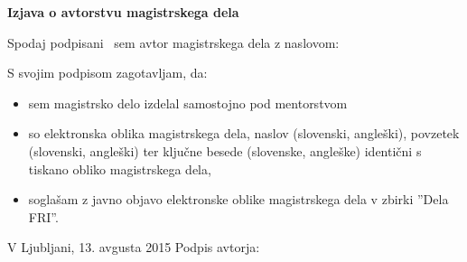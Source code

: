 \vspace*{1cm}
\begin{center}
{\Large \textbf{\sc Izjava o avtorstvu magistrskega dela}}
\end{center}

\vspace{1cm}
\noindent Spodaj podpisani \myname\ sem avtor magistrskega dela z naslovom:

\vspace{0.5cm}
\begin{center}
\emph{\mytitle}
\end{center}

\vspace{1cm}
\noindent S svojim podpisom zagotavljam, da:
\begin{itemize}
	\item sem magistrsko delo izdelal samostojno pod mentorstvom \mysupervisor\,

	\item so elektronska oblika magistrskega dela, naslov (slovenski, angleški), povzetek (slovenski, angleški) ter ključne besede (slovenske, angleške) identični s tiskano obliko magistrskega dela,
	\item soglašam z javno objavo elektronske oblike magistrskega dela v zbirki ''Dela FRI''.
\end{itemize}

\vspace{1cm}
\noindent V Ljubljani, 13. avgusta 2015 \hfill Podpis avtorja: